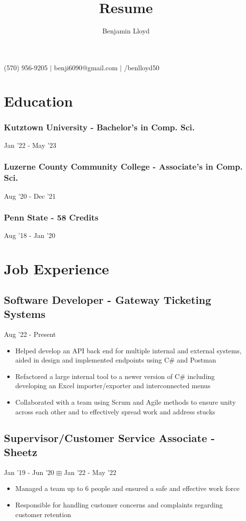 \documentclass{article}
\makeatletter
\renewcommand{\maketitle}{
\begin{center}
{\huge\bfseries
\theauthor}

\vspace{.25em}

{\faPhone{}}(570) 956-9205 $\vert$ {\faInbox{}}benji6090@gmail.com $\vert$ {\faGithub{}}/benlloyd50

\end{center}
}
\makeatother
\begin{document}
\title{Resume}

\author{Benjamin Lloyd}

\maketitle

\section{Education}
\subsubsection{Kutztown University - Bachelor's in Comp. Sci.} \hfill Jan '22 - May '23

\subsubsection{Luzerne County Community College - Associate's in Comp. Sci.} \hfill Aug '20 - Dec '21

\subsubsection{Penn State - 58 Credits} \hfill Aug '18 - Jan '20

\section{Job Experience}
\subsection{Software Developer - Gateway Ticketing Systems} \hfill Aug '22 - Present

\begin{itemize}
    \item Helped develop an API back end for multiple internal and external systems, aided in design and implemented endpoints using C\# and Postman
    \item Refactored a large internal tool to a newer version of C\# including developing an Excel importer/exporter and interconnected menus
    \item Collaborated with a team using Scrum and Agile methods to ensure unity across each other and to effectively spread work and address stucks
\end{itemize}

\subsection{Supervisor/Customer Service Associate - Sheetz} \hfill Jan '19 - Jun '20 $\boxplus$ Jan '22 - May '22
\begin{itemize}
  \item Managed a team up to 6 people and ensured a safe and effective work force
  \item Responsible for handling customer concerns and complaints regarding customer retention
\end{itemize}
\end{document}
